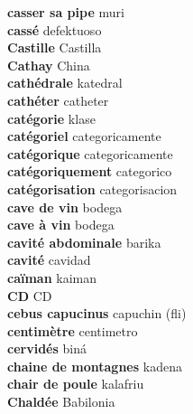 \textbf{ casser sa pipe  } muri \\
\textbf{ cassé  } defektuoso \\
\textbf{ Castille  } Castilla \\
\textbf{ Cathay  } China \\
\textbf{ cathédrale  } katedral \\
\textbf{ cathéter  } catheter \\
\textbf{ catégorie  } klase \\
\textbf{ catégoriel  } categoricamente \\
\textbf{ catégorique  } categoricamente \\
\textbf{ catégoriquement  } categorico \\
\textbf{ catégorisation  } categorisacion \\
\textbf{ cave de vin  } bodega \\
\textbf{ cave à vin  } bodega \\
\textbf{ cavité abdominale  } barika \\
\textbf{ cavité  } cavidad \\
\textbf{ caïman  } kaiman \\
\textbf{ CD  } CD \\
\textbf{ cebus capucinus  } capuchin (fli) \\
\textbf{ centimètre  } centimetro \\
\textbf{ cervidés  } biná \\
\textbf{ chaine de montagnes  } kadena \\
\textbf{ chair de poule  } kalafriu \\
\textbf{ Chaldée  } Babilonia \\
